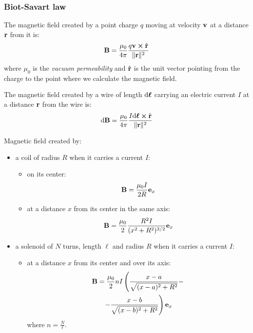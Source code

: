 \documentclass[../../../main.tex]{subfiles}
\begin{document}
\begin{multicols}{2}
  \subsubsection{Biot-Savart law}
  \begin{prop}
    The magnetic field created by a point charge $q$ moving at velocity $\boldsymbol{\mathrm{v}}$ at a distance $\boldsymbol{\mathrm{r}}$ from it is:
    $$\vf{B}=\frac{\mu_0}{4\pi}\frac{q\vf{v}\crossprod\Hat{\vf{r}}}{\|\vf{r}\|^2}$$ where $\mu_0$ is the \emph{vacuum permeability} and $\Hat{\boldsymbol{\mathrm{r}}}$ is the unit vector pointing from the charge to the point where we calculate the magnetic field.
  \end{prop}
  \begin{law}
    The magnetic field created by a wire of length $\dd\boldsymbol{\mathrm{\ell}}$ carrying an electric current $I$ at a distance $\boldsymbol{\mathrm{r}}$ from the wire is: $$\dd\vf{B}=\frac{\mu_0}{4\pi}\frac{I\dd\vf{\ell}\crossprod\hat{\vf{r}}}{\|\vf{r}\|^2}$$
  \end{law}
  \begin{prop}
    Magnetic field created by:
    \begin{itemize}
      \item a coil of radius $R$ when it carries a current $I$:
            \begin{itemize}
              \item on its center: $$\boldsymbol{\mathrm{B}}=\frac{\mu_0I}{2R}\boldsymbol{\mathrm{e}}_x$$
              \item at a distance $x$ from its center in the same axis: $$\boldsymbol{\mathrm{B}}=\frac{\mu_0}{2}\frac{R^2I}{(x^2+R^2)^{3/2}}\boldsymbol{\mathrm{e}}_x$$
            \end{itemize}
      \item a solenoid of $N$ turns, length $\ell$ and radius $R$ when it carries a current $I$:
            \begin{itemize}
              \item at a distance $x$ from its center and over its axis:
                    \begin{multline*} \boldsymbol{\mathrm{B}}=\frac{\mu_0}{2}nI\left(\frac{x-a}{\sqrt{(x-a)^2+R^2}}-\right.\\\left.-\frac{x-b}{\sqrt{(x-b)^2+R^2}}\right)\boldsymbol{\mathrm{e}}_x
                    \end{multline*} where $n=\frac{N}{\ell}$.
                    \begin{center}
                      \begin{minipage}{\linewidth}
                        \centering
                        

\end{minipage}
\end{center}
\end{itemize}
\end{itemize}
\end{prop}
\end{multicols}
\end{document}
